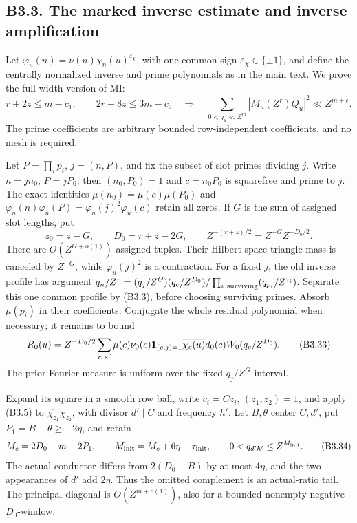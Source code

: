 \documentclass[11pt,a4paper]{article}
\begin{document}
\hypertarget{b3.3.-the-marked-inverse-estimate-and-inverse-amplification}{%
\subsection{B3.3. The marked inverse estimate and inverse
amplification}\label{b3.3.-the-marked-inverse-estimate-and-inverse-amplification}}

Let \(\varphi_u(n)=\nu(n)\chi_n(u)^{\varepsilon_\chi}\), with one common
sign \(\varepsilon_\chi\in\{\pm1\}\), and define the centrally
normalized inverse and prime polynomials as in the main text. We prove
the full-width version of MI: \[
r+2z\le m-c_1,\qquad2r+8z\le3m-c_2
\quad\Longrightarrow\quad
\sum_{0<q_u\ll Z^m}|M_u(Z^r)Q_u|^2\ll Z^{m+\epsilon}.
\tag{B3.31}
\] The prime coefficients are arbitrary bounded row-independent
coefficients, and no mesh is required.

Let \(P=\prod_i p_i\), \(j=(n,\allowbreak{}P)\), and fix the subset of slot primes
dividing \(j\). Write \(n=jn_0\), \(P=jP_0\); then \((n_0,\allowbreak{}P_0)=1\) and
\(c=n_0P_0\) is squarefree and prime to \(j\). The exact identities
\(\mu(n_0)=\mu(c)\mu(P_0)\) and
\(\varphi_u(n)\varphi_u(P)=\varphi_u(j)^2\varphi_u(c)\) retain all
zeros. If \(G\) is the sum of assigned slot lengths, put \[
z_0=z-G,\qquad D_0=r+z-2G,
\qquad Z^{-(r+z)/2}=Z^{-G}Z^{-D_0/2}.
\tag{B3.32}
\] There are \(O(Z^{G+o(1)})\) assigned tuples. Their Hilbert-space
triangle mass is canceled by \(Z^{-G}\), while \(\varphi_u(j)^2\) is a
contraction. For a fixed \(j\), the old inverse profile has argument
\(q_n/Z^r=(q_j/Z^G)(q_c/Z^{D_0})/\prod_{i\ {\rm surviving}}(q_{p_i}/Z^{z_i})\).
Separate this one common profile by (B3.3), before choosing surviving
primes. Absorb \(\mu(p_i)\) in their coefficients. Conjugate the whole
residual polynomial when necessary; it remains to bound \[
R_0(u)=Z^{-D_0/2}\sum_{c\ {\rm sf}}\mu(c)\nu_0(c)
 \mathbf1_{(c,j)=1}\overline{\chi_c(u)}d_0(c)W_0(q_c/Z^{D_0}).
\tag{B3.33}
\] The prior Fourier measure is uniform over the fixed \(q_j/Z^G\)
interval.

Expand its square in a smooth row ball, write \(c_i=Cz_i\),
\((z_1,\allowbreak{}z_2)=1\), and apply (B3.5) to
\(\overline{\chi_{z_1}}\chi_{z_2}\), with divisor \(d'\mid C\) and
frequency \(h'\). Let \(B,\allowbreak{}\theta\) center \(C,\allowbreak{}d'\), put
\(P_1=B-\theta\ge-2\eta\), and retain \[
M_c=2D_0-m-2P_1,\qquad M_{\rm init}=M_c+6\eta+\tau_{\rm init},
\qquad0<q_{d'h'}\le Z^{M_{\rm init}}.
\tag{B3.34}
\] The actual conductor differs from \(2(D_0-B)\) by at most \(4\eta\),
and the two appearances of \(d'\) add \(2\eta\). Thus the omitted
complement is an actual-ratio tail. The principal diagonal is
\(O(Z^{m+o(1)})\), also for a bounded nonempty negative \(D_0\)-window.
\end{document}
